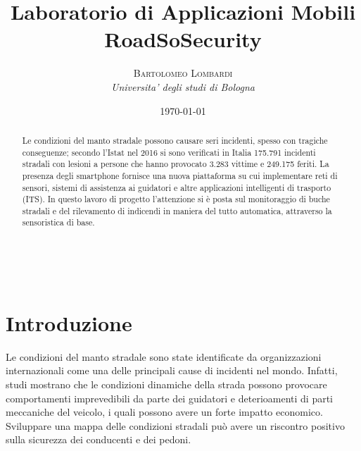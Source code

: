 \documentclass[a4paper, 11pt]{article} %
\title{\textbf{Laboratorio di Applicazioni Mobili}\\ %
RoadSoSecurity} %
\author{\textsc{Bartolomeo Lombardi} %
\\{\textit{Universita' degli studi di Bologna}}} %
\date{\today} %
\makeatletter
\renewcommand{\maketitle}{ %
\begin{flushright} %
{\LARGE\@title} %

\vspace{50pt} %

{\large\@author} %
\\\@date %

\vspace{40pt} %
\end{flushright}
}
\makeatother
\begin{document}
\maketitle %



\begin{abstract}
Le condizioni del manto stradale possono causare seri incidenti, spesso con tragiche conseguenze; secondo l'Istat nel 2016 si sono verificati in Italia 175.791 incidenti stradali con lesioni a persone che hanno provocato 3.283 vittime e 249.175 feriti. La presenza degli smartphone fornisce una nuova piattaforma su cui implementare reti di sensori, sistemi di assistenza ai guidatori e altre applicazioni intelligenti di trasporto (ITS). In questo lavoro di progetto l'attenzione si è posta sul monitoraggio di buche stradali e del rilevamento di indicendi in maniera del tutto automatica, attraverso la sensoristica di base.
\end{abstract}

\vspace{30pt} %


\section{Introduzione}
Le condizioni del manto stradale sono state identificate da organizzazioni internazionali come una delle principali cause di incidenti nel mondo. Infatti, studi mostrano che le condizioni dinamiche della strada possono provocare comportamenti imprevedibili da parte dei guidatori e deterioamenti di parti meccaniche del veicolo, i quali possono avere un forte impatto economico. Sviluppare una mappa delle condizioni stradali può avere un riscontro positivo sulla sicurezza dei conducenti e dei pedoni. 
\end{document}
